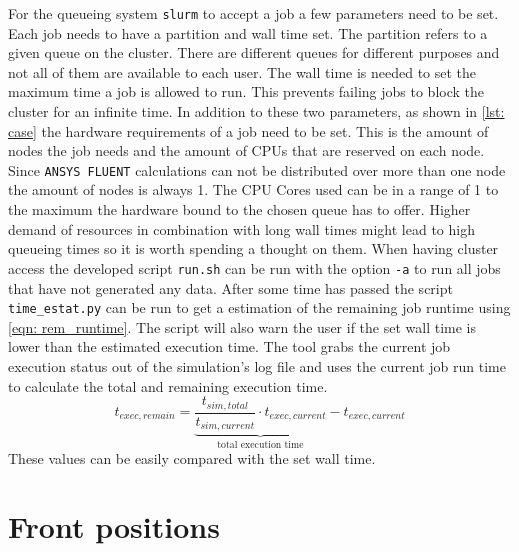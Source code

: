 \documentclass[../thesis.tex]{subfiles}
\begin{document}
For the queueing system \texttt{slurm} to accept a job a few parameters need to be set. Each job needs to have a partition and wall time set. The partition refers to a given queue on the cluster. There are different queues for different purposes and not all of them are available to each user.
The wall time is needed to set the maximum time a job is allowed to run. This prevents failing jobs to block the cluster for an infinite time. In addition to these two parameters, as shown in \autoref{lst: case} the hardware requirements of a job need to be set. This is the amount of nodes the job needs and the amount of CPUs that are reserved on each node. Since \texttt{ANSYS FLUENT} calculations can not be distributed over more than one node the amount of nodes is always 1. The CPU Cores used can be in a range of 1 to the maximum the hardware bound to the chosen queue has to offer. Higher demand of resources in combination with long wall times might lead to high queueing times so it is worth spending a thought on them. When having cluster access the developed script \texttt{run.sh} can be run with the option \texttt{-a} to run all jobs that have not generated any data. After some time has passed the script \texttt{time\_estat.py} can be run to get a estimation of the remaining job runtime using \autoref{eqn: rem_runtime}. The script will also warn the user if the set wall time is lower than the estimated execution time. The tool grabs the current job execution status out of the simulation's log file and uses the current job run time to calculate the total and remaining execution time. 
\begin{equation}
\label{eqn: rem_runtime}
t_{exec,remain} = \underbrace{\dfrac{t_{sim,total}}{t_{sim,current}} \cdot t_{exec,current}}_{\text{total execution time}}  - t_{exec,current} 
\end{equation}
These values can be easily compared with the set wall time.

\section{Front positions}
\label{chp: app_frontpos}
\end{document}
